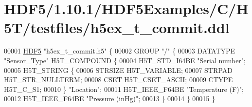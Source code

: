\hypertarget{_h_d_f5_21_810_81_2_h_d_f5_examples_2_c_2_h5_t_2testfiles_2h5ex__t__commit_8ddl_source}{}\section{H\+D\+F5/1.10.1/\+H\+D\+F5\+Examples/\+C/\+H5\+T/testfiles/h5ex\+\_\+t\+\_\+commit.ddl}
\label{_h_d_f5_21_810_81_2_h_d_f5_examples_2_c_2_h5_t_2testfiles_2h5ex__t__commit_8ddl_source}

\begin{DoxyCode}
00001 \hyperlink{namespace_h_d_f5}{HDF5} \textcolor{stringliteral}{"h5ex\_t\_commit.h5"} \{
00002 GROUP \textcolor{stringliteral}{"/"} \{
00003    DATATYPE \textcolor{stringliteral}{"Sensor\_Type"} H5T\_COMPOUND \{
00004       H5T\_STD\_I64BE \textcolor{stringliteral}{"Serial number"};
00005       H5T\_STRING \{
00006          STRSIZE H5T\_VARIABLE;
00007          STRPAD H5T\_STR\_NULLTERM;
00008          CSET H5T\_CSET\_ASCII;
00009          CTYPE H5T\_C\_S1;
00010       \} \textcolor{stringliteral}{"Location"};
00011       H5T\_IEEE\_F64BE \textcolor{stringliteral}{"Temperature (F)"};
00012       H5T\_IEEE\_F64BE \textcolor{stringliteral}{"Pressure (inHg)"};
00013    \}
00014 \}
00015 \}
\end{DoxyCode}
